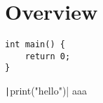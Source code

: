 \newpage

\section{Overview}

\begin{verbatim}
int main() {
    return 0;
}
\end{verbatim}

\texttt|print("hello")|
aaa
